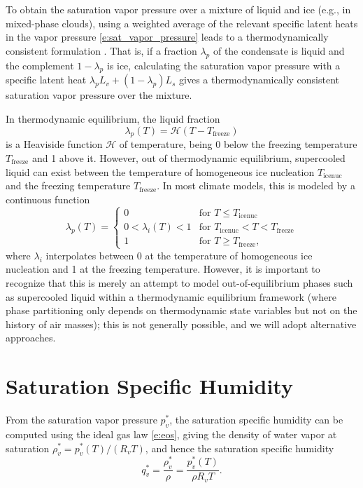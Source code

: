 \documentclass{report}
\begin{document}
To obtain the saturation vapor pressure over a mixture of liquid and ice (e.g., in mixed-phase clouds), using a weighted average of the relevant specific latent heats in the vapor pressure \eqref{e:sat_vapor_pressure} leads to a thermodynamically consistent formulation \citep{Pressel15a}. That is, if a fraction $\lambda_p$ of the condensate is liquid and the complement $1-\lambda_p$ is ice, calculating the saturation vapor pressure with a specific latent heat $\lambda_p L_v + (1-\lambda_p)L_s$ gives a thermodynamically consistent saturation vapor pressure over the mixture. 

In thermodynamic equilibrium, the liquid fraction 
\begin{equation}\label{e:liquid_fraction}
    \lambda_p(T) = \mathcal{H}(T-T_{\mathrm{freeze}})
\end{equation} 
is a Heaviside function $\mathcal{H}$ of temperature, being 0 below the freezing temperature $T_{\mathrm{freeze}}$ and 1 above it. However, out of thermodynamic equilibrium, supercooled liquid can exist between the temperature of homogeneous ice nucleation $T_{\mathrm{icenuc}}$ and the freezing temperature $T_{\mathrm{freeze}}$. In most climate models, this is modeled by a continuous function 
\begin{equation}
    \lambda_p(T) = 
    \begin{cases}
    0 & \text{for } T\le T_{\mathrm{icenuc}}\\
    0<\lambda_i(T)<1 & \text{for } T_{\mathrm{icenuc}} < T <  T_{\mathrm{freeze}}\\
    1   & \text{for } T\ge T_{\mathrm{freeze}},
    \end{cases}
\end{equation} 
where $\lambda_i$ interpolates between 0 at the temperature of homogeneous ice nucleation and 1 at the freezing temperature. However, it is important to recognize that this is merely an attempt to model out-of-equilibrium phases such as supercooled liquid within a thermodynamic equilibrium framework (where phase partitioning only depends on thermodynamic state variables but not on the history of air masses); this is not generally possible, and we will adopt alternative approaches.

\section{Saturation Specific Humidity}
\label{sct:sat_spef_hum}
From the saturation vapor pressure $p_v^*$, the saturation specific humidity can be computed using the ideal gas law \eqref{e:eos}, giving the density of water vapor at saturation $\rho_v^* = p_v^*(T)/(R_v T)$, and hence the saturation specific humidity 
\begin{equation}\label{e:sat_shum}
     q_v^* = \frac{\rho_v^*}{\rho} = \frac{p_v^*(T)}{\rho R_v T}.
\end{equation}
\end{document}
